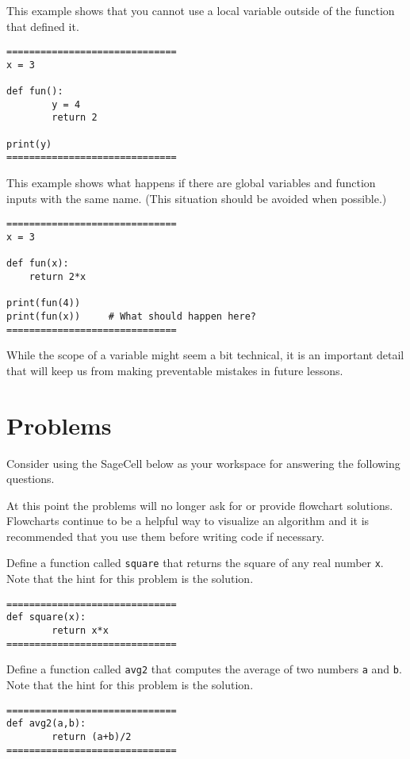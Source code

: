 \documentclass{ximera}
\begin{document}
This example shows that you cannot use a local variable outside of the function that defined it.

\begin{verbatim}
==============================
x = 3

def fun():
        y = 4
        return 2

print(y)
==============================
\end{verbatim}

This example shows what happens if there are global variables and function inputs with the same name. (This situation should be avoided when possible.)

\begin{verbatim}
==============================
x = 3

def fun(x):
	return 2*x

print(fun(4))
print(fun(x))     # What should happen here?
==============================
\end{verbatim}

While the scope of a variable might seem a bit technical, it is an important detail that will keep us from making preventable mistakes in future lessons.

\section{Problems}

Consider using the SageCell below as your workspace for answering the following questions. 

At this point the problems will no longer ask for or provide flowchart solutions. Flowcharts continue to be a helpful way to visualize an algorithm and it is recommended that you use them before writing code if necessary. 

\begin{question}
	Define a function called \verb|square| that returns the square of any real number \verb|x|. Note that the hint for this problem is the solution.
	\begin{hint}
\begin{verbatim}
==============================
def square(x):
        return x*x
==============================
\end{verbatim}
	\end{hint}
\end{question}

\begin{question}
	Define a function called \verb|avg2| that computes the average of two numbers \verb|a| and \verb|b|. Note that the hint for this problem is the solution.
	\begin{hint}
\begin{verbatim}
==============================
def avg2(a,b):
        return (a+b)/2
==============================
\end{verbatim}
	\end{hint}
\end{question}
\end{document}
